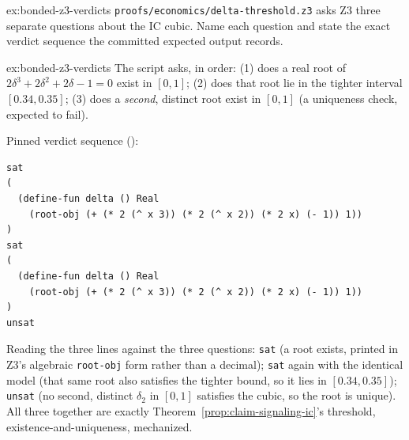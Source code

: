 \documentclass[11pt,a4paper]{article}
\theoremstyle{definition}
\theoremstyle{remark}
\begin{document}
\begin{pdexercise}[kind=Trace,rating=2]{ex:bonded-z3-verdicts}
\texttt{proofs/economics/delta-threshold.z3} asks Z3 three separate questions about the IC cubic. Name each question and state the exact verdict sequence the committed expected output records.
\end{pdexercise}
\begin{pdsolution}{ex:bonded-z3-verdicts}
The script asks, in order: (1) does a real root of $2\delta^3+2\delta^2+2\delta-1=0$ exist in $[0,1]$; (2) does that root lie in the tighter interval $[0.34, 0.35]$; (3) does a \emph{second}, distinct root exist in $[0,1]$ (a uniqueness check, expected to fail).

Pinned verdict sequence ():
\begin{lstlisting}
sat
(
  (define-fun delta () Real
    (root-obj (+ (* 2 (^ x 3)) (* 2 (^ x 2)) (* 2 x) (- 1)) 1))
)
sat
(
  (define-fun delta () Real
    (root-obj (+ (* 2 (^ x 3)) (* 2 (^ x 2)) (* 2 x) (- 1)) 1))
)
unsat
\end{lstlisting}
Reading the three lines against the three questions: \texttt{sat} (a root exists, printed in Z3's algebraic \texttt{root-obj} form rather than a decimal); \texttt{sat} again with the identical model (that same root also satisfies the tighter bound, so it lies in $[0.34,0.35]$); \texttt{unsat} (no second, distinct $\delta_2$ in $[0,1]$ satisfies the cubic, so the root is unique). All three together are exactly Theorem~\ref{prop:claim-signaling-ic}'s threshold, existence-and-uniqueness, mechanized.
\end{pdsolution}
\end{document}
